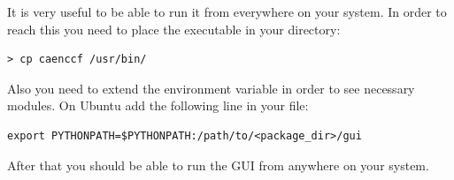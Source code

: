 It is very useful to be able to run it from everywhere on your system. In order to reach
this you need to place the executable in your  directory:
\begin{lstlisting}
> cp caenccf /usr/bin/
\end{lstlisting}
Also you need to extend the  environment variable in order 
to see necessary modules. On Ubuntu add the following line in your  file:
\begin{lstlisting}
export PYTHONPATH=$PYTHONPATH:/path/to/<package_dir>/gui
\end{lstlisting}
After that you should be able to run the GUI from anywhere on your system. 

